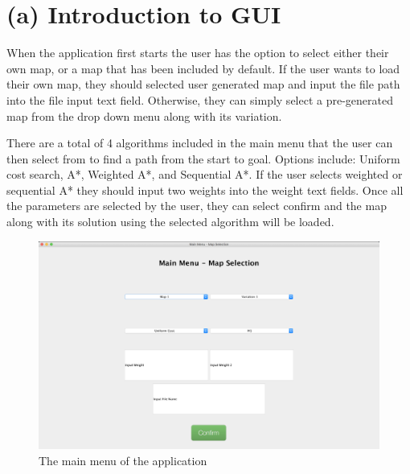 \section{(a) Introduction to GUI }

When the application first starts the user has the option to select either their own
map, or a map that has been included by default. If the user wants to load their own map, they should selected
user generated map and input the file path into the file input text field. Otherwise, they
can simply select a pre-generated map from the drop down menu along with its variation.

There are a total of 4 algorithms included in the main menu that the user can then select from to find a path
from the start to goal. Options include: Uniform cost search, A*, Weighted A*, and Sequential A*. If the
user selects weighted or sequential A* they should input two weights into the weight text fields. Once all the parameters
are selected by the user, they can select confirm and the map along with its solution using the selected algorithm
will be loaded.


\begin{figure}[H]
	\centering
  \includegraphics[scale = 0.30]{main_menu.png}
	\caption{The main menu of the application}
	\label{fig: Main menu}
\end{figure}
